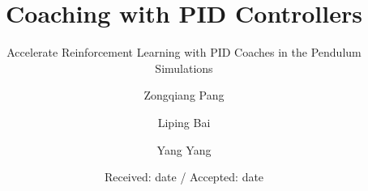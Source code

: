 \usepackage[noadjust]{cite}
\usepackage[font=scriptsize]{caption}
\captionsetup[figure]{font=scriptsize}

\usepackage[numbers,sort&compress]{natbib}
\usepackage{graphicx}
%
%
%
%
%


\title{Coaching with PID Controllers %
}
\subtitle{Accelerate Reinforcement Learning with PID Coaches in the Pendulum Simulations}


\author{Zongqiang Pang\and
        Liping Bai \and
        Yang Yang}





\date{Received: date / Accepted: date}


\maketitle

